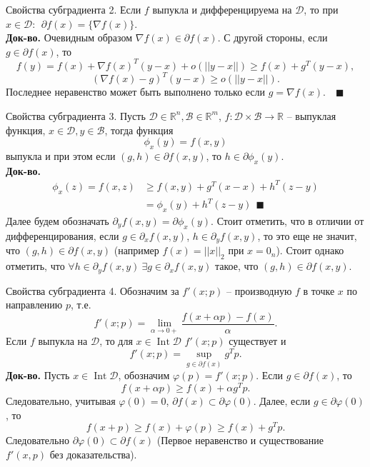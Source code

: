 \documentclass[10pt, handout]{beamer}
\DeclareMathOperator{\interior}{Int}
\begin{document}
\begin{frame}{Свойства субградиента}
2. Если $f$ выпукла и дифференцируема на $\mathcal{D}$, то при $x\in\mathcal{D}:~~\partial f(x)=\{\nabla f(x)\}$.\\
\pause
\vspace{1em}
\textbf{Док-во.} Очевидным образом $\nabla f(x)\in \partial f(x)$. С другой стороны, если $g\in \partial f(x)$, то
$$
f(y)=f(x)+\nabla f(x)^T(y-x)+o(||y-x||)\geq f(x)+g^T(y-x),
$$
$$
(\nabla f(x)-g)^T(y-x)\geq o(||y-x||).
$$
Последнее неравенство может быть выполнено только если $g=\nabla f(x)$.~~$\blacksquare$\\
\end{frame}

\begin{frame}{Свойства субградиента}
3. Пусть $\mathcal{D}\in \mathbb{R}^n, \mathcal{B}\in \mathbb{R}^m$, 
$f:\mathcal{D}\times\mathcal{B}\rightarrow \mathbb{R}$ -- выпуклая функция, 
$x\in \mathcal{D}, y\in\mathcal{B}$, тогда функция
$$
\phi_x(y)=f(x, y)
$$
выпукла и при этом если $(g, h)\in \partial f(x, y)$, то $h\in \partial \phi_x(y)$.\\
\pause
\vspace{1em}
\textbf{Док-во.}
\begin{align*}
\phi_x(z)=f(x, z)&\geq f(x, y)+g^T(x-x)+h^T(z-y)\\
&=\phi_x(y)+h^T(z-y)~~\blacksquare
\end{align*}
\pause
Далее будем обозначать $\partial_y f(x,y)=\partial \phi_x(y)$. Стоит отметить, что в отличии от дифференцирования, 
если $g\in \partial_x f(x,y)$, $h\in \partial_y f(x,y)$, то это еще не значит, что $(g,h)\in \partial f(x,y)$ 
(например $f(x)=||x||_2$ при $x=0_n$). Стоит однако отметить, что  $\forall h\in\partial_y f(x,y)~\exists g\in\partial_xf(x,y)$ такое, 
что $(g, h)\in\partial f(x,y)$.
\end{frame}

\begin{frame}{Свойства субградиента}
4. Обозначим за $f'(x;p)$ -- производную $f$ в точке $x$ по направлению $p$, т.е.
$$
f'(x;p)=\lim_{\alpha\rightarrow 0+}\frac{f(x+\alpha p)-f(x)}{\alpha}.
$$
Если $f$ выпукла на $\mathcal{D}$, то для $x\in \interior \mathcal{D}$ $f'(x;p)$ существует и
$$
f'(x;p)=\sup_{g\in \partial f(x)}g^Tp.
$$
\pause
\textbf{Док-во.} Пусть $x\in\interior\mathcal{D}$, обозначим $\varphi(p)=f'(x;p)$. Если $g\in \partial f(x)$, то
$$
f(x+\alpha p)\geq f(x)+\alpha g^Tp.
$$
Следовательно, учитывая $\varphi(0)=0$, $\partial f(x)\subset \partial \varphi(0)$. Далее, если $g\in \partial \varphi(0)$, то
$$
f(x+p)\geq f(x)+\varphi(p)\geq f(x)+g^Tp.
$$
Следовательно $\partial \varphi(0)\subset \partial f(x)$ (Первое неравенство и существование $f'(x, p)$ без доказательства).
\end{frame}
\end{document}
